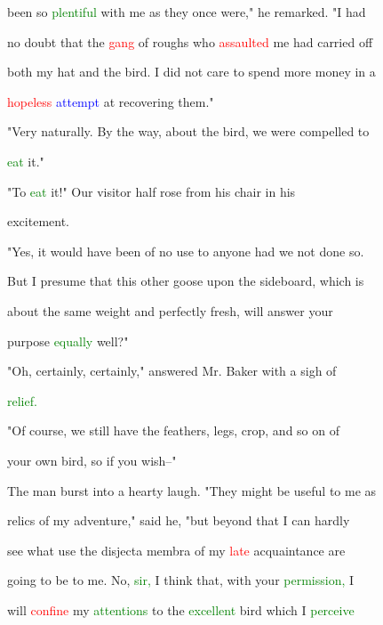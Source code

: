  been so \textcolor{green}{plentiful} with me as they once were," he remarked. "I had

 no \textcolor{BurntOrange}{doubt} that the \textcolor{red}{gang} of roughs who \textcolor{red}{assaulted} me had carried off

 both my hat and the bird. I did not care to spend more \textcolor{BurntOrange}{money} in a

 \textcolor{red}{hopeless} \textcolor{blue}{attempt} at recovering them."



 "Very naturally. By the way, about the bird, we were compelled to

 \textcolor{green}{eat} it."



 "To \textcolor{green}{eat} it!" Our \textcolor{BurntOrange}{visitor} half rose from his chair in his

 \textcolor{BurntOrange}{excitement.}



 "Yes, it would have been of no use to anyone had we not done so.

 But I presume that this other goose upon the sideboard, which is

 about the same \textcolor{BurntOrange}{weight} and perfectly fresh, will answer your

 purpose \textcolor{green}{equally} well?"



 "Oh, certainly, certainly," answered Mr. Baker with a sigh of

 \textcolor{green}{relief.}



 "Of course, we still have the feathers, legs, crop, and so on of

 your own bird, so if you wish--"



 The man burst into a hearty \textcolor{BurntOrange}{laugh.} "They might be useful to me as

 relics of my \textcolor{BurntOrange}{adventure,"} said he, "but beyond that I can hardly

 see what use the disjecta membra of my \textcolor{red}{late} acquaintance are

 going to be to me. No, \textcolor{green}{sir,} I think that, with your \textcolor{green}{permission,} I

 will \textcolor{red}{confine} my \textcolor{green}{attentions} to the \textcolor{green}{excellent} bird which I \textcolor{green}{perceive}


